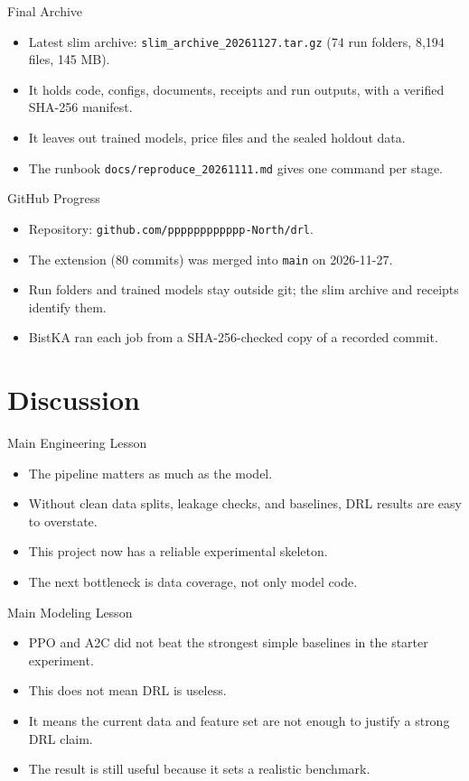 \documentclass[aspectratio=43,10pt]{beamer}
\begin{document}
\begin{frame}{Final Archive}
\begin{itemize}
  \item Latest slim archive: \texttt{slim\_archive\_20261127.tar.gz} (74 run folders, 8{,}194 files, 145 MB).
  \item It holds code, configs, documents, receipts and run outputs, with a verified SHA-256 manifest.
  \item It leaves out trained models, price files and the sealed holdout data.
  \item The runbook \texttt{docs/reproduce\_20261111.md} gives one command per stage.
\end{itemize}
\end{frame}

\begin{frame}{GitHub Progress}
\begin{itemize}
  \item Repository: \texttt{github.com/pppppppppppp-North/drl}.
  \item The extension (80 commits) was merged into \texttt{main} on 2026-11-27.
  \item Run folders and trained models stay outside git; the slim archive and receipts identify them.
  \item BistKA ran each job from a SHA-256-checked copy of a recorded commit.
\end{itemize}
\end{frame}

\section{Discussion}

\begin{frame}{Main Engineering Lesson}
\begin{itemize}
  \item The pipeline matters as much as the model.
  \item Without clean data splits, leakage checks, and baselines, DRL results are easy to overstate.
  \item This project now has a reliable experimental skeleton.
  \item The next bottleneck is data coverage, not only model code.
\end{itemize}
\end{frame}

\begin{frame}{Main Modeling Lesson}
\begin{itemize}
  \item PPO and A2C did not beat the strongest simple baselines in the starter experiment.
  \item This does not mean DRL is useless.
  \item It means the current data and feature set are not enough to justify a strong DRL claim.
  \item The result is still useful because it sets a realistic benchmark.
\end{itemize}
\end{frame}
\end{document}
